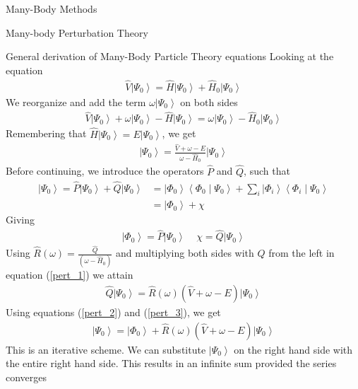 \documentclass[twoside,english]{uiofysmaster}
\begin{document}
\begin{chapter}{Many-Body Methods}
\begin{section}{Many-body Perturbation Theory}
	 	\begin{subsection}{General derivation of Many-Body Particle Theory equations}
	 		Looking at the equation
	 		\begin{align}
	 			\hat V \left| \Psi_0 \right> = \hat H \left| \Psi_0 \right> + \hat H_0 \left| \Psi_0 \right> 
	 		\end{align}
	 		We reorganize and add the term $\omega \left| \Psi_0 \right>$ on both sides
	 		\begin{align}
	 			\hat V \left| \Psi_0 \right> + \omega \left| \Psi_0 \right> - \hat H \left| \Psi_0 \right> = \omega \left| \Psi_0 \right> - \hat H_0 \left| \Psi_0 \right> 
	 		\end{align}
	 		Remembering that $\hat H \left| \Psi_0 \right> = E\left| \Psi_0 \right> $, we get 
	 		\begin{align}
	 			\left| \Psi_0 \right> = \frac{ \hat V + \omega - E }{\omega - \hat H_0} \left| \Psi_0 \right>
	 			\label{pert_1}
	 		\end{align}
	 		Before continuing, we introduce the operators $\hat P$ and $\hat Q$, such that
	 		\begin{align}
	 			\left| \Psi_0 \right> = \hat P \left| \Psi_0 \right> + \hat Q \left| \Psi_0 \right> 
	 			&= \left| \Phi_0 \right> \left< \Phi_0 \middle| \Psi_0 \right> + \sum_i \left| \Phi_i \right> \left< \Phi_i \middle| \Psi_0 \right> 
	 			\label{pert_2} \\
	 			&= \left| \Phi_0 \right> + \chi
	 		\end{align}
	 		Giving
	 		\begin{align}
	 			\left| \Phi_0 \right> = \hat P \left| \Psi_0 \right> \;\;\;\; \chi = \hat Q \left| \Psi_0 \right> 
	 			\label{pert_3}
	 		\end{align}
	 		Using $\hat R(\omega) = \frac{\hat{Q}}{\left( \omega - \hat H_0 \right)}$ and multiplying both sides with $\hat Q$ from the left in equation (\ref{pert_1}) we attain
	 		\begin{align}
	 			\hat Q \left| \Psi_0 \right> = \hat R(\omega) \left( \hat V + \omega - E \right) \left| \Psi_0 \right>
	 		\end{align}
	 		Using equations (\ref{pert_2}) and (\ref{pert_3}), we get
	 		\begin{align}
	 			\left| \Psi_0 \right> = \left| \Phi_0 \right> + \hat R(\omega) \left( \hat V + \omega - E \right) \left| \Psi_0 \right>
	 		\end{align}
	 		This is an iterative scheme. We can substitute $\left| \Psi_0 \right>$ on the right hand side with the entire right hand side. This results in an infinite sum provided the series converges

\end{subsection}
\end{section}
\end{chapter}
\end{document}
